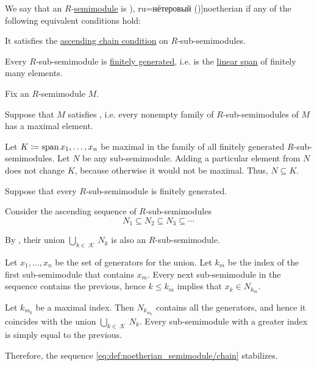 \begin{definition}\label{def:noetherian_semimodule}
  We say that an \( R \)-\hyperref[def:semimodule]{semimodule} is \term[bg=ньотеров (\cite[41]{КоцевСидеров2016КомутативнаАлгебра}), ru=нётеровый (\cite[def. 9.4.1]{Винберг2014КурсАлгебры})]{noetherian} if any of the following equivalent conditions hold:
  \begin{thmenum}
     It satisfies the \hyperref[def:chain_condition]{ascending chain condition} on \( R \)-sub-semimodules.

     Every \( R \)-sub-semimodule is \hyperref[def:semimodule/generated]{finitely generated}, i.e. is the \hyperref[def:semimodule/submodel]{linear span} of finitely many elements.
  \end{thmenum}
\end{definition}
\begin{defproof}
  Fix an \( R \)-semimodule \( M \).

   Suppose that \( M \) satisfies , i.e. every nonempty family of \( R \)-sub-semimodules of \( M \) has a maximal element.

  Let \( K \coloneqq \operatorname{span}{ x_1, \ldots, x_n } \) be maximal in the family of all finitely generated \( R \)-sub-semimodules. Let \( N \) be any sub-semimodule. Adding a particular element from \( N \) does not change \( K \), because otherwise it would not be maximal. Thus, \( N \subseteq K \).

   Suppose that every \( R \)-sub-semimodule is finitely generated.

  Consider the ascending sequence of \( R \)-sub-semimodules
  \begin{equation}\label{eq:def:noetherian_semimodule/chain}
    N_1 \subseteq N_2 \subseteq N_3 \subseteq \cdots
  \end{equation}

  By , their union \( \bigcup_{k \in \mscrK} N_k \) is also an \( R \)-sub-semimodule.

  Let \( x_1, \ldots, x_n \) be the set of generators for the union. Let \( k_m \) be the index of the first sub-semimodule that contains \( x_m \). Every next sub-semimodule in the sequence contains the previous, hence \( k \leq k_m \) implies that \( x_k \in N_{k_m} \).

  Let \( k_{m_0} \) be a maximal index. Then \( N_{k_{m_0}} \) contains all the generators, and hence it coincides with the union \( \bigcup_{k \in \mscrK} N_k \). Every sub-semimodule with a greater index is simply equal to the previous.

  Therefore, the sequence \eqref{eq:def:noetherian_semimodule/chain} stabilizes.
\end{defproof}

